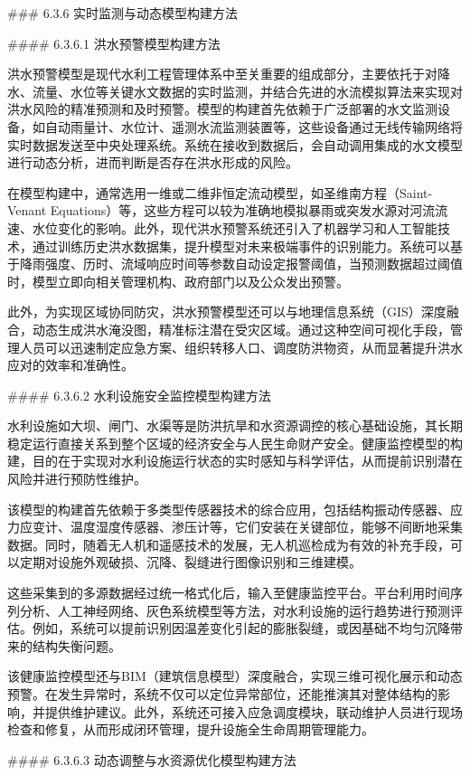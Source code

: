 \#\#\# 6.3.6 实时监测与动态模型构建方法

\#\#\#\# 6.3.6.1 洪水预警模型构建方法

洪水预警模型是现代水利工程管理体系中至关重要的组成部分，主要依托于对降水、流量、水位等关键水文数据的实时监测，并结合先进的水流模拟算法来实现对洪水风险的精准预测和及时预警。模型的构建首先依赖于广泛部署的水文监测设备，如自动雨量计、水位计、遥测水流监测装置等，这些设备通过无线传输网络将实时数据发送至中央处理系统。系统在接收到数据后，会自动调用集成的水文模型进行动态分析，进而判断是否存在洪水形成的风险。

在模型构建中，通常选用一维或二维非恒定流动模型，如圣维南方程（Saint-Venant Equations）等，这些方程可以较为准确地模拟暴雨或突发水源对河流流速、水位变化的影响。此外，现代洪水预警系统还引入了机器学习和人工智能技术，通过训练历史洪水数据集，提升模型对未来极端事件的识别能力。系统可以基于降雨强度、历时、流域响应时间等参数自动设定报警阈值，当预测数据超过阈值时，模型立即向相关管理机构、政府部门以及公众发出预警。

此外，为实现区域协同防灾，洪水预警模型还可以与地理信息系统（GIS）深度融合，动态生成洪水淹没图，精准标注潜在受灾区域。通过这种空间可视化手段，管理人员可以迅速制定应急方案、组织转移人口、调度防洪物资，从而显著提升洪水应对的效率和准确性。

\#\#\#\# 6.3.6.2 水利设施安全监控模型构建方法

水利设施如大坝、闸门、水渠等是防洪抗旱和水资源调控的核心基础设施，其长期稳定运行直接关系到整个区域的经济安全与人民生命财产安全。健康监控模型的构建，目的在于实现对水利设施运行状态的实时感知与科学评估，从而提前识别潜在风险并进行预防性维护。

该模型的构建首先依赖于多类型传感器技术的综合应用，包括结构振动传感器、应力应变计、温度湿度传感器、渗压计等，它们安装在关键部位，能够不间断地采集数据。同时，随着无人机和遥感技术的发展，无人机巡检成为有效的补充手段，可以定期对设施外观破损、沉降、裂缝进行图像识别和三维建模。

这些采集到的多源数据经过统一格式化后，输入至健康监控平台。平台利用时间序列分析、人工神经网络、灰色系统模型等方法，对水利设施的运行趋势进行预测评估。例如，系统可以提前识别因温差变化引起的膨胀裂缝，或因基础不均匀沉降带来的结构失衡问题。

该健康监控模型还与BIM（建筑信息模型）深度融合，实现三维可视化展示和动态预警。在发生异常时，系统不仅可以定位异常部位，还能推演其对整体结构的影响，并提供维护建议。此外，系统还可接入应急调度模块，联动维护人员进行现场检查和修复，从而形成闭环管理，提升设施全生命周期管理能力。

\#\#\#\# 6.3.6.3 动态调整与水资源优化模型构建方法


